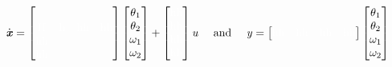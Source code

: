 \begin{equation}
\dot{\text{\textit{\textbf{x}}}} = \begin{bmatrix}
& & & \\[0.3em]
\text{\color{white}H\color{black}} &\text{\color{white}h\color{black}} &\text{\color{white}hh\color{black}} &\text{\color{white}hh\color{black}} \\
\text{\color{white}hh\color{black}}& & & \\
\text{\color{white}hh\color{black}} & & &
\end{bmatrix}
\begin{bmatrix}
\theta_1\\
\theta_2\\
\omega_1\\
\omega_2\\
\end{bmatrix}
+
\begin{bmatrix}
\text{\color{white}hh\color{black}}\\
\text{\color{white}hh\color{black}}\\
\text{\color{white}hh\color{black}}\\
\text{\color{white}hh\color{black}}\\
\end{bmatrix}\text{\textit{{u}}}
\quad \text{ and } \quad
\text{\textit{{y}}}=\begin{bmatrix}
\text{\color{white}hh\color{black}} &\text{\color{white}hh\color{black}}&\text{\color{white}hh\color{black}}&\text{\color{white}hh\color{black}}
\end{bmatrix}
\begin{bmatrix}
\theta_1\\
\theta_2\\
\omega_1\\
\omega_2\\
\end{bmatrix}
\label{eq:4}
\end{equation}